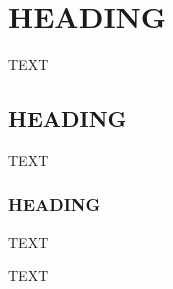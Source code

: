 \documentclass[essd, manuscript]{copernicus}
\begin{document}
\section{HEADING}
TEXT


\subsection{HEADING}
TEXT


\subsubsection{HEADING}
TEXT


\conclusions  %
TEXT












\appendix
\section{}    %

\subsection{}     %


\noappendix       %

\end{document}

